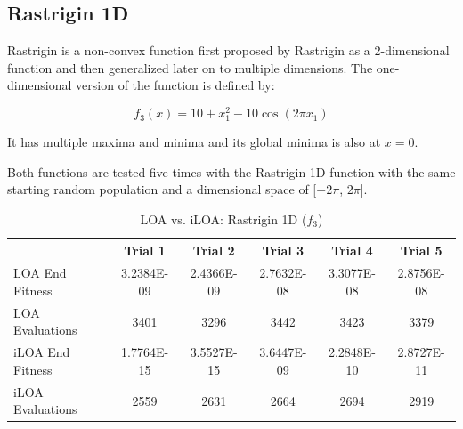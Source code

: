 \subsection{Rastrigin 1D}

\par Rastrigin is a non-convex function first proposed by Rastrigin as a 2-dimensional function and then generalized later on to multiple dimensions. The one-dimensional version of the function is defined by:

$$
f_3(x) = 10 + x_1^2 - 10 \cos (2 \pi x_1)
$$

It has multiple maxima and minima and its global minima is also at $x=0$.

\par Both functions are tested five times with the Rastrigin 1D function with the same starting random population and a dimensional space of [$-2\pi$, $2\pi$].

\begin{table}[ht]
\scriptsize
\begin{tabular}{l|ccccc}
\textbf{}        & \textbf{Trial 1} & \textbf{Trial 2} & \textbf{Trial 3} & \textbf{Trial 4} & \textbf{Trial 5} \\
\hline
LOA End Fitness  & 3.2384E-09       & 2.4366E-09       & 2.7632E-08       & 3.3077E-08       & 2.8756E-08       \\
LOA Evaluations  & 3401             & 3296             & 3442             & 3423             & 3379             \\
iLOA End Fitness & 1.7764E-15       & 3.5527E-15       & 3.6447E-09       & 2.2848E-10       & 2.8727E-11       \\
iLOA Evaluations & 2559             & 2631             & 2664             & 2694             & 2919
\end{tabular}
\caption{ \scriptsize LOA vs. iLOA: Rastrigin 1D ($f_3$)}
\end{table}

